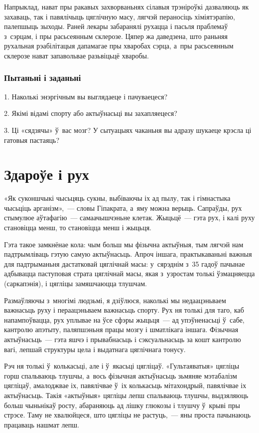 Напрыклад, нават пры ракавых захворваньнях сілавыя трэніроўкі дазваляюць як захаваць, так і павялічыць цяглічную масу, лягчэй пераносіць хіміятэрапію, палепшыць зыходы. Раней лекары забаранялі рухацца і пасьля праблемаў з~сэрцам, і пры расьсеянным склерозе. Цяпер жа даведзена, што раньняя рухальная рэабілітацыя дапамагае пры хваробах сэрца, а~пры расьсеянным склерозе нават запавольвае разьвіцьцё хваробы.

\subsubsection{Пытаньні і заданьні}

1. Наколькі энэргічным вы выглядаеце і пачуваецеся?

2. Якімі відамі спорту або актыўнасьці вы захапляецеся?

3. Ці «сядзячы» ў~вас мозг? У сытуацыях чаканьня вы адразу шукаеце крэсла ці гатовыя пастаяць?


\section{Здароўе і рух}

«Як суконшчыкі чысьцяць сукны, выбіваючы іх ад пылу, так і гімнастыка чысьціць арганізм»,~--- словы Гіпакрата, а~яму можна верыць. Сапраўды, рух стымулюе аўтафагію~--- самаачышчэньне клетак. Жыцьцё~--- гэта рух, і калі руху становіцца менш, то становіцца менш і жыцьця.

Гэта такое замкнёнае кола: чым больш мы фізычна актыўныя, тым лягчэй нам падтрымліваць гэтую самую актыўнасьць. Апроч іншага, практыкаваньні важныя для падтрыманьня дастатковай цяглічнай масы: у~сярэднім з~35 гадоў пачынае адбывацца паступовая страта цяглічнай масы, якая з~узростам толькі ўзмацняецца (саркапэнія), і цягліцы замяшчаюцца тлушчам.

Размаўляючы з~многімі людзьмі, я дзіўлюся, наколькі мы недаацэньваем важнасьць руху і пераацэньваем важнасьць спорту. Рух ня толькі для таго, каб напампоўвацца, рух уплывае на ўсе сфэры жыцьця~--- ад упэўненасьці ў~сабе, кантролю апэтыту, паляпшэньня працы мозгу і шматлікага іншага. Фізычная актыўнасьць~--- гэта яшчэ і прывабнасьць і сэксуальнасьць за кошт кантролю вагі, лепшай структуры цела і выдатнага цяглічнага тонусу.

Рэч ня толькі ў~колькасьці, але і ў~якасьці цягліцаў. «Гультаяватыя» цягліцы горш спальваюць тлушчы, а~вось фізычная актыўнасьць зьмяняе мэтабалізм цягліцаў, амалоджвае іх, павялічвае ў~іх колькасьць мітахондрый, павялічвае іх актыўнасьць. Такія «актыўныя» цягліцы лепш спальваюць тлушчы, выдзяляюць больш чыньнікаў росту, абараняюць ад лішку глюкозы і тлушчу ў~крыві пры стрэсе. Таму не хвалюйцеся, што цягліцы не растуць,~--- яны проста пачынаюць працаваць нашмат лепш.

